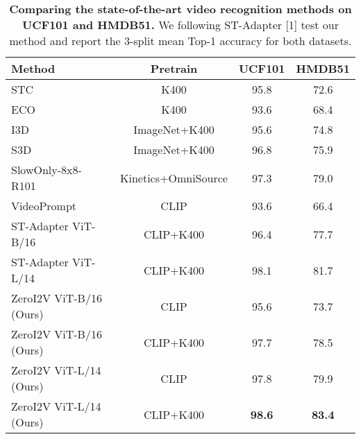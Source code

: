 \begin{table}[h]
    \centering
    \caption{\textbf{Comparing the state-of-the-art video recognition methods on UCF101 and HMDB51.} We following ST-Adapter [1] test our method and report the 3-split mean Top-1 accuracy for both datasets.}
    \label{tab:ucfhmdb}
    \begin{tabular}{lccc}
        \toprule
        Method & Pretrain & UCF101 & HMDB51 \\
        \midrule
STC~\citep{stc} & K400 & 95.8 & 72.6 \\
ECO~\citep{eco} & K400 & 93.6 & 68.4 \\

        I3D~\citep{i3dk400} & ImageNet+K400 & 95.6 & 74.8 \\
        S3D~\citep{s3d} & ImageNet+K400 & 96.8 & 75.9 \\
        SlowOnly-8x8-R101~\citep{slowfast} & Kinetics+OmniSource & 97.3 & 79.0 \\
        VideoPrompt~\citep{videoprompt} & CLIP & 93.6 & 66.4 \\
\midrule
        ST-Adapter ViT-B/16~\citep{stadapter} & CLIP+K400 & 96.4 & 77.7 \\
        ST-Adapter ViT-L/14~\citep{stadapter} & CLIP+K400 & 98.1 & 81.7 \\
        \midrule
        ZeroI2V ViT-B/16 (Ours) & CLIP & 95.6 & 73.7 \\
        ZeroI2V ViT-B/16 (Ours) & CLIP+K400 & 97.7 & 78.5 \\
        ZeroI2V ViT-L/14  (Ours) & CLIP & 97.8 & 79.9 \\
        ZeroI2V ViT-L/14  (Ours) & CLIP+K400 & \textbf{98.6} & \textbf{83.4} \\
        \bottomrule
    \end{tabular}
    \label{tab:ucf_hmdb}
\end{table}

